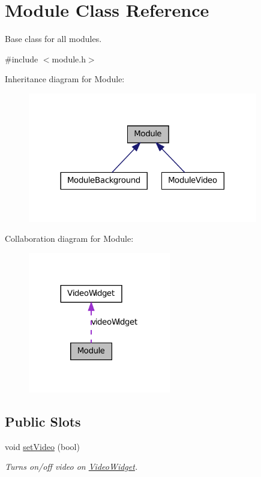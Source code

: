 \hypertarget{class_module}{
\section{Module Class Reference}
\label{dd/df9/class_module}
}


Base class for all modules.  




{\ttfamily \#include $<$module.h$>$}



Inheritance diagram for Module:
\nopagebreak
\begin{figure}[H]
\begin{center}
\leavevmode
\includegraphics[width=284pt]{d1/d4b/class_module__inherit__graph}
\end{center}
\end{figure}


Collaboration diagram for Module:\nopagebreak
\begin{figure}[H]
\begin{center}
\leavevmode
\includegraphics[width=176pt]{d0/d57/class_module__coll__graph}
\end{center}
\end{figure}
\subsection*{Public Slots}
\begin{DoxyCompactItemize}
\item 
void \hyperlink{class_module_a44b6835871fe594af9e8b687ca3f349f}{setVideo} (bool)
\begin{DoxyCompactList}\small\item\em Turns on/off video on \hyperlink{class_video_widget}{VideoWidget}. \item\end{DoxyCompactList}\end{DoxyCompactItemize}
